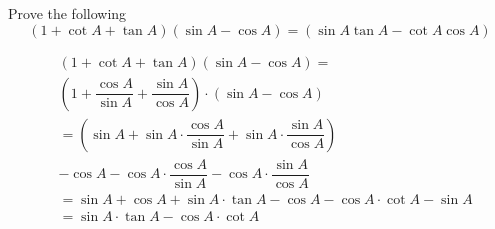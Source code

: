 

\question[2]  Prove the following  
\[ (1+\cot A+\tan A)(\sin A-\cos A)=(\sin A\tan A-\cot A\cos A) \]

\begin{solution}[\halfpage]
  \begin{align}
     &(1+\cot A+\tan A)(\sin A-\cos A) = \nonumber\\
		 &\left( 1+\dfrac{\cos A}{\sin A} + \dfrac{\sin A}{\cos A}\right)\cdot (\sin A - \cos A) \\
		 &= \left( \sin A + \sin A\cdot\dfrac{\cos A}{\sin A} + \sin A\cdot\dfrac{\sin A}{\cos A}\right) \nonumber\\
		 &-\cos A - \cos A\cdot\dfrac{\cos A}{\sin A} - \cos A\cdot\dfrac{\sin A}{\cos A} \\
		 &= \sin A + \cos A + \sin A\cdot\tan A - \cos A - \cos A\cdot\cot A - \sin A \\
		 &= \sin A\cdot\tan A - \cos A\cdot \cot A
  \end{align}

\end{solution}
